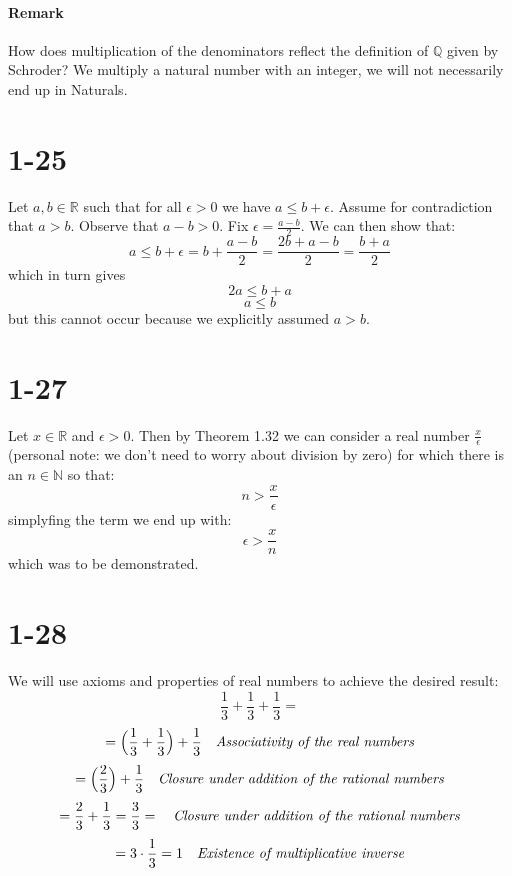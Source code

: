 \documentclass{article}
\begin{document}
\paragraph*{Remark} How does multiplication of the denominators reflect the definition of \(\mathbb{Q}\) given by Schroder?
We multiply a natural number with an integer, we will not necessarily end up in Naturals.
\section*{1-25}
Let \(a, b \in \mathbb{R}\) such that for all \(\epsilon > 0\) we have \(a \leq b + \epsilon\). Assume for contradiction
that \(a > b\). Observe that \(a - b > 0\). Fix \(\epsilon = \frac{a - b}{2}\). We can then show that:
\begin{equation*}
    a \leq b + \epsilon = b + \frac{a - b}{2} = \frac{2b + a - b}{2} = \frac{b + a}{2}
\end{equation*}
which in turn gives
\begin{equation*}
    2a \leq b + a
\end{equation*}
\begin{equation*}
    a \leq b 
\end{equation*}
but this cannot occur because we explicitly assumed \(a > b\).
\section*{1-27}
Let \(x \in \mathbb{R}\) and \(\epsilon > 0\). Then by Theorem 1.32 we can consider a real number
\(\frac{x}{\epsilon}\) (personal note: we don't need to worry about division by zero) 
for which there is an \(n \in \mathbb{N}\) so that:
\begin{equation*}
    n > \frac{x}{\epsilon}
\end{equation*} 
simplyfing the term we end up with:
\begin{equation*}
    \epsilon > \frac{x}{n}
\end{equation*}
which was to be demonstrated.
\section*{1-28}
We will use axioms and properties of real numbers to achieve the desired result:
\begin{equation*}
    \frac{1}{3} + \frac{1}{3} + \frac{1}{3} = 
\end{equation*}
\begin{equation*}
    = \Big(\frac{1}{3} + \frac{1}{3}\Big) + \frac{1}{3} \ \ \ \mbox{\emph{Associativity of the real numbers}}
\end{equation*}
\begin{equation*}
    = \Big(\frac{2}{3}\Big) + \frac{1}{3} \ \ \ \mbox{\emph{Closure under addition of the rational numbers}}
\end{equation*}
\begin{equation*}
    = \frac{2}{3} + \frac{1}{3} = \frac{3}{3} = \ \ \ \mbox{\emph{Closure under addition of the rational numbers}}
\end{equation*}
\begin{equation*}
    =  3 \cdot \frac{1}{3} = 1 \ \ \ \mbox{\emph{Existence of multiplicative inverse}}
\end{equation*}
\end{document}
